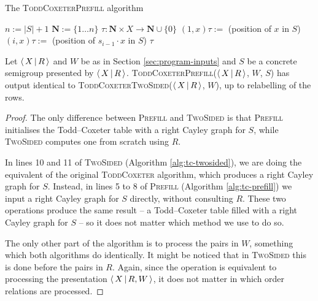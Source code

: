 \begin{algorithm}
\caption{The \textsc{ToddCoxeterPrefill} algorithm}
\label{alg:tc-prefill}
\begin{algorithmic}[1]
\State $n := |S| + 1$
\State $\mathbf{N} := \{1 \ldots n\}$
\State $\tau : \mathbf{N} \times X \to \mathbf{N} \cup \{0\}$
  \State $(1, x)\tau :=$ (position of $x$ in $S$)
    \State $(i, x)\tau :=$ (position of $s_{i-1} \cdot x$ in $S$)
  \EndFor
\EndFor
{}
    \State {}
  \EndFor
\EndFor
\State \Return $\tau$
\EndProcedure
\end{algorithmic}
\end{algorithm}

\begin{theorem}
  Let $\left\langle\,X\,\middle|\,R\,\right\rangle$ and $W$ be as in Section \ref{sec:program-inputs} and $S$ be a
  concrete semigroup presented by $\left\langle\,X\,\middle|\,R\,\right\rangle$.
  \textsc{ToddCoxeterPrefill}($\left\langle\,X\,\middle|\,R\,\right\rangle$, $W$, $S$) has output identical to
  \textsc{ToddCoxeterTwoSided}($\left\langle\,X\,\middle|\,R\,\right\rangle$, $W$), up to relabelling of the rows.
  \begin{proof}
    The only difference between \textsc{Prefill} and \textsc{TwoSided} is that
    \textsc{Prefill} initialises the Todd--Coxeter table with a right Cayley
    graph for $S$, while \textsc{TwoSided} computes one from scratch using $R$.


    In lines 10 and 11 of \textsc{TwoSided} (Algorithm \ref{alg:tc-twosided}),
    we are doing the equivalent of the original \textsc{ToddCoxeter} algorithm,
    which produces a right Cayley graph for $S$.  Instead, in lines 5 to 8 of
    \textsc{Prefill} (Algorithm \ref{alg:tc-prefill}) we input a right Cayley
    graph for $S$ directly, without consulting $R$.  These two operations
    produce the same result -- a Todd--Coxeter table filled with a right Cayley
    graph for $S$ -- so it does not matter which method we use to do so.

    The only other part of the algorithm is to process the pairs in $W$,
    something which both algorithms do identically.  It might be noticed that in
    \textsc{TwoSided} this is done before the pairs in $R$.  Again, since the
    operation is equivalent to processing the presentation $\left\langle\,X\,\middle|\,R,W\,\right\rangle$, it
    does not matter in which order relations are processed.
  \end{proof}
\end{theorem}

